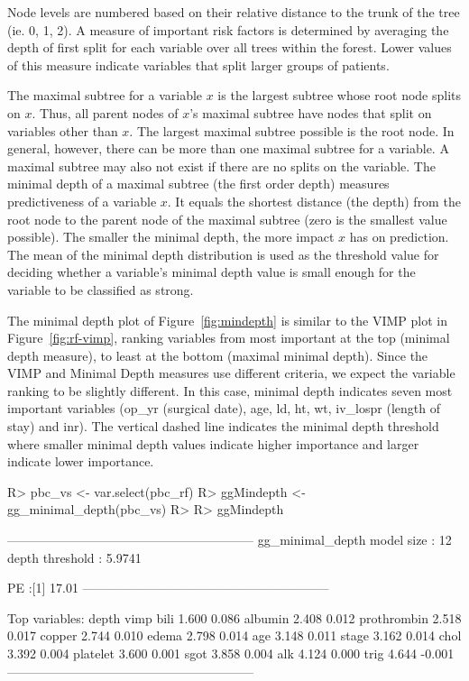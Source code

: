 \documentclass[nojss]{jss}\usepackage[]{graphicx}\usepackage[]{color}
\begin{document}
Node levels are numbered based on their relative distance to the trunk of the tree (ie. 0, 1, 2).  A measure of important risk factors is determined by averaging the depth of first split for each variable over all trees within the forest. Lower values of this measure indicate variables that split larger groups of patients. 

The maximal subtree for a variable $x$ is the largest subtree whose root node splits on $x$. Thus, all parent nodes of $x$'s maximal subtree have nodes that split on variables other than $x$. The largest maximal subtree possible is the root node. In general, however, there can be more than one maximal subtree for a variable. A maximal subtree may also not exist if there are no splits on the variable. The minimal depth of a maximal subtree (the first order depth) measures predictiveness of a variable $x$. It equals the shortest distance (the depth) from the root node to the parent node of the maximal subtree (zero is the smallest value possible). The smaller the minimal depth, the more impact $x$ has on prediction. The mean of the minimal depth distribution is used as the threshold value for deciding whether a variable's minimal depth value is small enough for the variable to be classified as strong. 

The minimal depth plot of Figure~\ref{fig:mindepth} is similar to the VIMP plot in Figure~\ref{fig:rf-vimp}, ranking variables from most important at the top (minimal depth measure), to least at the bottom (maximal minimal depth). Since the VIMP and Minimal Depth measures use different criteria, we expect the variable ranking to be slightly different. In this case, minimal depth indicates seven most important variables (op\_yr (surgical date), age, ld, ht, wt, iv\_lospr (length of stay) and inr). The vertical dashed line indicates the minimal depth threshold where smaller minimal depth values indicate higher importance and larger indicate lower importance.


\begin{Schunk}
\begin{Sinput}
R> pbc_vs <- var.select(pbc_rf)
R> ggMindepth <- gg_minimal_depth(pbc_vs)
R> 
R> ggMindepth
\end{Sinput}
\end{Schunk}

\begin{Schunk}
\begin{Soutput}
-----------------------------------------------------------
gg_minimal_depth
model size         : 12 
depth threshold    : 5.9741 

PE :[1] 17.01
-----------------------------------------------------------

Top variables:
            depth   vimp
bili        1.600  0.086
albumin     2.408  0.012
prothrombin 2.518  0.017
copper      2.744  0.010
edema       2.798  0.014
age         3.148  0.011
stage       3.162  0.014
chol        3.392  0.004
platelet    3.600  0.001
sgot        3.858  0.004
alk         4.124  0.000
trig        4.644 -0.001
-----------------------------------------------------------
\end{Soutput}
\end{Schunk}
\end{document}
